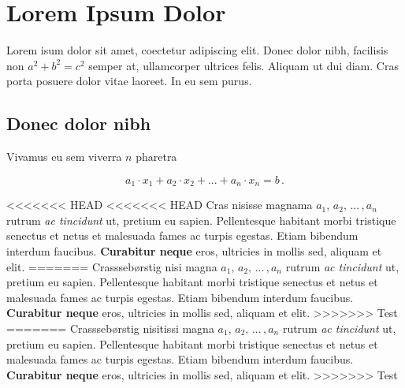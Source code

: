 

\setcounter{chapter}{0} 

\chapter{Lorem Ipsum Dolor} \label{mychapter}

Lorem isum dolor sit amet, coectetur adipiscing elit. Donec dolor nibh, facilisis non $a^2 + b^2 = c^2$ semper at, ullamcorper ultrices felis. Aliquam ut dui diam. Cras porta posuere dolor vitae laoreet. In eu sem purus. 

\section{Donec dolor nibh}
\label{myfirstsection}

Vivamus  eu sem viverra $n$ pharetra

\begin{equation} \label{myeq.1}
a_1\cdot x_1+a_2\cdot x_2+...+a_n\cdot x_n=b\,.
\end{equation}

<<<<<<< HEAD
<<<<<<< HEAD
Cras nisisse magnama $a_1,\,a_2,\,...\,,a_n$ rutrum \textit{ac tincidunt} ut, pretium eu sapien. Pellentesque habitant morbi tristique senectus et netus et malesuada fames ac turpis egestas. Etiam bibendum interdum faucibus. \textbf{Curabitur neque} eros, ultricies in mollis sed, aliquam et elit. 
=======
Crasssebørstig nisi magna $a_1,\,a_2,\,...\,,a_n$ rutrum \textit{ac tincidunt} ut, pretium eu sapien. Pellentesque habitant morbi tristique senectus et netus et malesuada fames ac turpis egestas. Etiam bibendum interdum faucibus. \textbf{Curabitur neque} eros, ultricies in mollis sed, aliquam et elit. 
>>>>>>> Test
=======
Crasssebørstig nisitissi magna $a_1,\,a_2,\,...\,,a_n$ rutrum \textit{ac tincidunt} ut, pretium eu sapien. Pellentesque habitant morbi tristique senectus et netus et malesuada fames ac turpis egestas. Etiam bibendum interdum faucibus. \textbf{Curabitur neque} eros, ultricies in mollis sed, aliquam et elit. 
>>>>>>> Test


